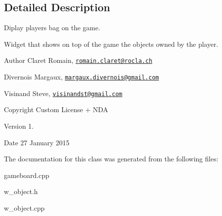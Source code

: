 \subsection{Detailed Description}
Diplay player\textquotesingle{}s bag on the game. 

Widget that shows on top of the game the objects owned by the player. \begin{DoxyAuthor}{Author}
Claret Romain, \href{mailto:romain.claret@rocla.ch}{\tt romain.\+claret@rocla.\+ch} 

Divernois Margaux, \href{mailto:margaux.divernois@gmail.com}{\tt margaux.\+divernois@gmail.\+com} 

Visinand Steve, \href{mailto:visinandst@gmail.com}{\tt visinandst@gmail.\+com} 
\end{DoxyAuthor}
\begin{DoxyCopyright}{Copyright}
Custom License + N\+D\+A 
\end{DoxyCopyright}
\begin{DoxyVersion}{Version}
1. 
\end{DoxyVersion}
\begin{DoxyDate}{Date}
27 January 2015 
\end{DoxyDate}


The documentation for this class was generated from the following files\+:\begin{DoxyCompactItemize}
\item 
gameboard.\+cpp\item 
w\+\_\+object.\+h\item 
w\+\_\+object.\+cpp\end{DoxyCompactItemize}
